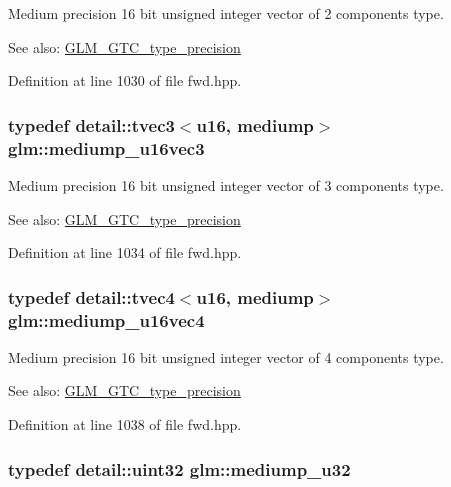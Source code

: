Medium precision 16 bit unsigned integer vector of 2 components type. \begin{Desc}
\item[See also:]\hyperlink{group__gtc__type__precision}{GLM\_\-GTC\_\-type\_\-precision} \end{Desc}


Definition at line 1030 of file fwd.hpp.\hypertarget{group__gtc__type__precision_g82dbfd263ced8d03577008a3ef096598}{
\subsubsection[mediump\_\-u16vec3]{\setlength{\rightskip}{0pt plus 5cm}typedef detail::tvec3$<$u16, mediump$>$ {\bf glm::mediump\_\-u16vec3}}}
\label{group__gtc__type__precision_g82dbfd263ced8d03577008a3ef096598}


Medium precision 16 bit unsigned integer vector of 3 components type. \begin{Desc}
\item[See also:]\hyperlink{group__gtc__type__precision}{GLM\_\-GTC\_\-type\_\-precision} \end{Desc}


Definition at line 1034 of file fwd.hpp.\hypertarget{group__gtc__type__precision_gad8b540f4231f69823c39fe9dfcb945a}{
\subsubsection[mediump\_\-u16vec4]{\setlength{\rightskip}{0pt plus 5cm}typedef detail::tvec4$<$u16, mediump$>$ {\bf glm::mediump\_\-u16vec4}}}
\label{group__gtc__type__precision_gad8b540f4231f69823c39fe9dfcb945a}


Medium precision 16 bit unsigned integer vector of 4 components type. \begin{Desc}
\item[See also:]\hyperlink{group__gtc__type__precision}{GLM\_\-GTC\_\-type\_\-precision} \end{Desc}


Definition at line 1038 of file fwd.hpp.\hypertarget{group__gtc__type__precision_gd0c27a525045c299a92306eb4cd7c13a}{
\subsubsection[mediump\_\-u32]{\setlength{\rightskip}{0pt plus 5cm}typedef detail::uint32 {\bf glm::mediump\_\-u32}}}
\label{group__gtc__type__precision_gd0c27a525045c299a92306eb4cd7c13a}


